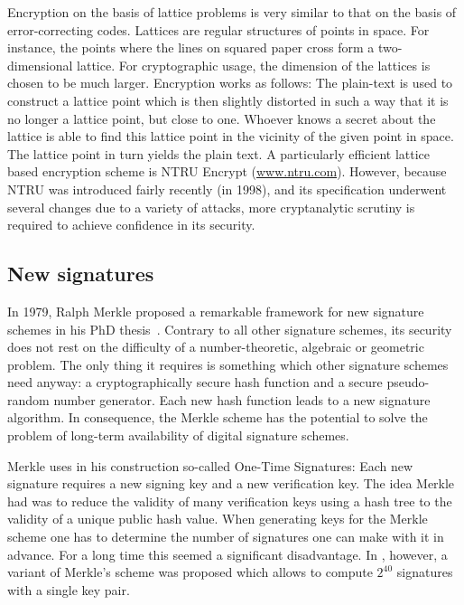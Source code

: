 Encryption on the basis of lattice problems
is very similar to that on the basis of
error-correcting codes.  Lattices are regular
structures of points in space.  For instance, the
points where the lines on squared paper cross form
a two-dimensional lattice.  For cryptographic
usage, the dimension of the lattices is chosen to
be much larger.  Encryption works as follows: The
plain-text is used to construct a lattice point
which is then slightly distorted in such a way
that it is no longer a lattice point, but close to
one.  Whoever knows a secret about the lattice is
able to find this lattice point in the vicinity of
the given point in space.  The lattice point in
turn yields the plain text.  A particularly
efficient lattice based encryption scheme is NTRU
Encrypt (\url{www.ntru.com}).
However, because
NTRU was introduced fairly recently (in 1998), and
its specification underwent several changes due to
a variety of attacks, more cryptanalytic scrutiny
is required to achieve confidence in its security.

\subsection{New signatures}
\label{sec:signatures}

In 1979, Ralph Merkle proposed a remarkable
framework for new signature schemes in his PhD
thesis~\cite{merkle-thesis:1979}.
Contrary to all other signature schemes, its
security does not rest on the difficulty of a
number-theoretic, algebraic or geometric problem.
The only thing it requires is something which
other signature schemes need anyway: a
cryptographically secure hash function and a
secure pseudo-random number generator.  Each new
hash function leads to a new signature algorithm.
In consequence, the Merkle scheme has the
potential to solve the problem of long-term
availability of digital signature schemes.

Merkle uses in his construction so-called One-Time
Signatures: Each new signature requires a new
signing key and a new verification key.  The idea
Merkle had was to reduce the validity of many
verification keys using a hash tree to the
validity of a unique public hash value.  When
generating keys for the Merkle scheme one has to
determine the number of signatures one can make
with it in advance.  For a long time this seemed a
significant disadvantage.  In
\cite{buchmann/coronado/dahmen/doering/klintsevich:2006},
however, a variant of Merkle's scheme was proposed
which allows to compute $2^{40}$ signatures with a
single key pair.


